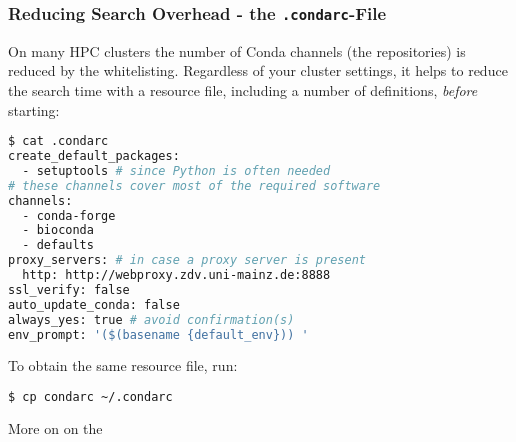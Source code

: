 \begin{frame}[fragile]
  \frametitle{Reducing Search Overhead - the \texttt{.condarc}-File}
  On many HPC clusters the number of Conda channels (the repositories) is reduced by the whitelisting. Regardless of your cluster settings, it helps to reduce the search time with a resource file, including  a number of definitions, \emph{before} starting:
  \begin{lstlisting}[language=Bash, style=Shell, basicstyle=\tiny]
$ cat .condarc
create_default_packages:
  - setuptools # since Python is often needed
# these channels cover most of the required software
channels:
  - conda-forge
  - bioconda
  - defaults
proxy_servers: # in case a proxy server is present
  http: http://webproxy.zdv.uni-mainz.de:8888
ssl_verify: false
auto_update_conda: false
always_yes: true # avoid confirmation(s)
env_prompt: '($(basename {default_env})) '
  \end{lstlisting}
  To obtain the same resource file, run:
  \begin{lstlisting}[language=Bash, style=Shell, basicstyle=\footnotesize]
$ cp condarc ~/.condarc
  \end{lstlisting}
  More on  on the 
\end{frame}
